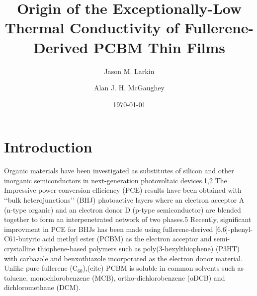 \documentclass[aps,prb,onecolumn,preprint,superscriptaddress,footinbib,amsmath,amssymb,floatfix]{revtex4}
\begin{document}
\title{Origin of the Exceptionally-Low Thermal Conductivity of 
Fullerene-Derived PCBM Thin Films}
\author{Jason M. Larkin}
\author{Alan J. H. McGaughey}
\date{\today}
\begin{abstract}



\end{abstract}
\maketitle
\clearpage
\section{\label{S:Introduction}Introduction}

Organic materials have been investigated as substitutes of silicon and 
other inorganic
semiconductors in next-generation photovoltaic devices.1,2 The
Impressive power conversion efficiency (PCE) results have 
been obtained with ‘‘bulk heterojunctions’’ (BHJ) photoactive 
layers where an electron acceptor A (n-type organic) and an
electron donor D (p-type semiconductor) are blended together to form an  
interpenetrated network of two phases.5 
Recently, significant improvment in PCE for BHJs has been made 
using fullerene-derived 
[6,6]-phenyl-C61-butyric acid
methyl ester (PCBM) as the electron acceptor and  
semi-crystalline thiophene-based polymers such as 
poly(3-hexylthiophene) (P3HT) with carbazole and benxothiazole 
incorporated as the electron donor material. 
Unlike pure fullerene (C$_{60}$),(cite) PCBM is soluble in
common solvents such as toluene, monochlorobenzene
(MCB),
ortho-dichlorobenzene (oDCB) 
and dichloromethane
(DCM). 
\end{document}
